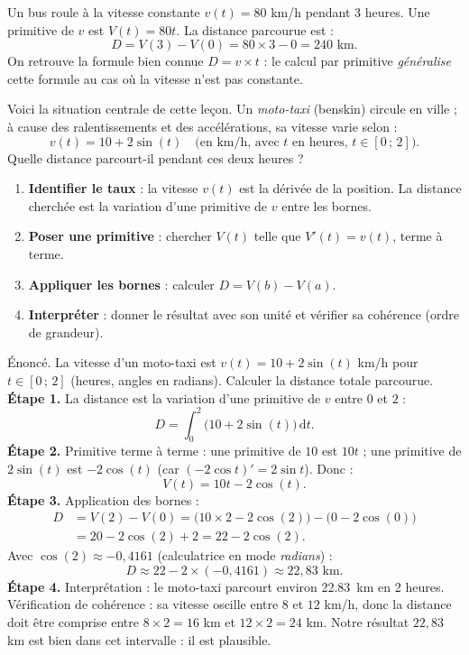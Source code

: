 \documentclass[11pt]{article}
\newcounter{popsec}
\newcounter{popsub}
\newcommand{\courssub}[1]{%
  \stepcounter{popsub}%
  \par\vspace{9pt}\noindent{\popxbold\fontsize{11.5}{13}\selectfont\color{popink}{\color{poporange}\thepopsec.\thepopsub}\hspace{6pt}#1}\par\nopagebreak\vspace{4pt}
}
\begin{document}
\begin{exemplebox}
Un bus roule à la vitesse constante $v(t) = 80$ km/h pendant 3 heures. Une primitive de $v$ est $V(t) = 80t$. La distance parcourue est :
\[ D = V(3) - V(0) = 80 \times 3 - 0 = 240 \text{ km}. \]
On retrouve la formule bien connue $D = v \times t$ : le calcul par primitive \emph{généralise} cette formule au cas où la vitesse n'est pas constante.
\end{exemplebox}

\courssub{Le problème du moto-taxi}

Voici la situation centrale de cette leçon. Un \emph{moto-taxi} (benskin) circule en ville ; à cause des ralentissements et des accélérations, sa vitesse varie selon :
\[ v(t) = 10 + 2\sin(t) \quad \text{(en km/h, avec } t \text{ en heures, } t \in [0\,;\,2]\text{)}. \]
Quelle distance parcourt-il pendant ces deux heures ?

\begin{methode}
\begin{enumerate}
\item \textbf{Identifier le taux} : la vitesse $v(t)$ est la dérivée de la position. La distance cherchée est la variation d'une primitive de $v$ entre les bornes.
\item \textbf{Poser une primitive} : chercher $V(t)$ telle que $V'(t) = v(t)$, terme à terme.
\item \textbf{Appliquer les bornes} : calculer $D = V(b) - V(a)$.
\item \textbf{Interpréter} : donner le résultat avec son unité et vérifier sa cohérence (ordre de grandeur).
\end{enumerate}
\end{methode}

\begin{exoresolu}
Énoncé. La vitesse d'un moto-taxi est $v(t) = 10 + 2\sin(t)$ km/h pour $t \in [0\,;\,2]$ (heures, angles en radians). Calculer la distance totale parcourue.
\tcblower
\textbf{Étape 1.} La distance est la variation d'une primitive de $v$ entre $0$ et $2$ :
\[ D = \int_0^2 \bigl(10 + 2\sin(t)\bigr)\,\mathrm{d}t. \]
\textbf{Étape 2.} Primitive terme à terme : une primitive de $10$ est $10t$ ; une primitive de $2\sin(t)$ est $-2\cos(t)$ (car $(-2\cos t)' = 2\sin t$). Donc :
\[ V(t) = 10t - 2\cos(t). \]
\textbf{Étape 3.} Application des bornes :
\begin{align*}
D &= V(2) - V(0) = \bigl(10 \times 2 - 2\cos(2)\bigr) - \bigl(0 - 2\cos(0)\bigr) \\
&= 20 - 2\cos(2) + 2 = 22 - 2\cos(2).
\end{align*}
Avec $\cos(2) \approx -0{,}4161$ (calculatrice en mode \emph{radians}) :
\[ D \approx 22 - 2 \times (-0{,}4161) \approx 22{,}83 \text{ km}. \]
\textbf{Étape 4.} Interprétation : le moto-taxi parcourt environ \SI{22,83}{km} en 2 heures. Vérification de cohérence : sa vitesse oscille entre $8$ et $12$ km/h, donc la distance doit être comprise entre $8 \times 2 = 16$ km et $12 \times 2 = 24$ km. Notre résultat $22{,}83$ km est bien dans cet intervalle : il est plausible.
\end{exoresolu}
\end{document}
